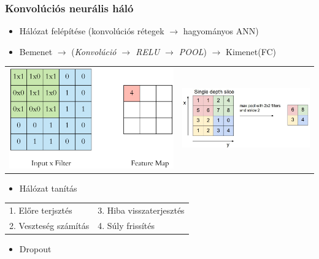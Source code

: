 \documentclass{beamer}
\begin{document}
\begin{frame}[fragile]
\frametitle{Konvolúciós neurális háló}
\begin{itemize}
\item Hálózat felépítése (konvolúciós rétegek $\rightarrow$ hagyományos ANN)
\item Bemenet $\rightarrow$ (\textit{Konvolúció $\rightarrow$ RELU $\rightarrow$ POOL}) $\rightarrow$ Kimenet(FC)
\end{itemize}
\begin{tabular}{c c}
\includegraphics[scale=0.15]{convolution} & \includegraphics[scale=0.2]{maxpool}
\end{tabular}
\begin{itemize}
\item Hálózat tanítás
\end{itemize}
\begin{table}
\centering
\begin{tabular}{l l}
	1. Előre terjsztés & 3. Hiba visszaterjesztés\\
	2. Veszteség számítás & 4. Súly frissítés
\end{tabular}
\end{table}
\begin{itemize}
\item Dropout
\end{itemize}
\end{frame}
\end{document}
